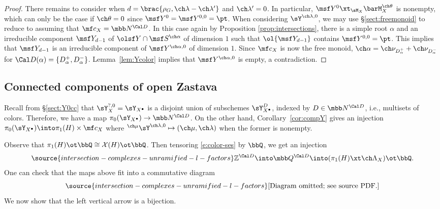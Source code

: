 \begin{proof}
There remains to consider when $d= \brac{\rho_G,\ch\lambda-\ch\lambda'}$ and $\ch\lambda'=0$.
In particular, $\msf Y^0 \xt_{\sM_X} \barM^{\ch\theta}_X$ is nonempty, which can only
be the case if $\ch\theta = 0$ since $\msf Y^0 = \msf Y^{0,0}=\pt$.
When considering $\sY^{\ch\lambda,0}$, we may
use \S\ref{sect:freemonoid} to reduce to assuming that $\mf c_X = \mbb N^{\Cal D}$.
In this case again by Proposition \ref{prop:intersections}, there is a simple root $\alpha$
and an irreducible component $\msf Y_{d-1}$ of $\olsf Y \cap \msf S^{\ch\alpha}$
of dimension $1$ such that $\ol{\msf Y_{d-1}}$ contains $\msf Y^{0,0} = \pt$.
This implies that $\msf Y_{d-1}$ is an irreducible component of
$\msf Y^{\ch\alpha,0}$ of dimension $1$.
Since $\mf c_X$ is now the free monoid, $\ch\alpha = \ch\nu_{D_\alpha^+} + \ch\nu_{D_\alpha^-}$
for $\Cal D(\alpha) = \{ D_\alpha^+, D_\alpha^- \}$.
Lemma~\ref{lem:Ycolor} implies that $\msf Y^{\ch\alpha,0}$ is empty, a contradiction.
\end{proof}



\subsection{Connected components of open Zastava} \label{sect:connected-open}
Recall from \S\ref{sect:Y0cc} that $\sY_X^{?,0}=\sY_{X^\bullet}$ is a disjoint union of subschemes
$\sY_{X^\bullet}^{D}$, indexed by $D \in \mbb N^{\Cal D}$, i.e., multisets of colors.
Therefore, we have a map $\pi_0(\sY_{X^\bullet}) \to \mbb N^{\Cal D}$.
On the other hand, Corollary~\ref{cor:compY} gives an injection
$\pi_0(\sY_{X^\bullet}) \into \pi_1(H) \times \mf c_X$
where $^{\ch\mu}\sY^{\ch\lambda,0} \mapsto (\ch\mu,\ch\lambda)$ when the former
is nonempty.

Observe that $\pi_1(H) \ot \bbQ \cong \mathcal X(H) \ot \bbQ$.
Then tensoring \eqref{e:color-ses} by $\bbQ$, we get an injection
\begin{equation} \label{e:color-inj-piH}
\source{intersection-complexes-unramified-l-factors}
    \mathbb Z^{\Cal D} \into \mbb Q^{\Cal D} \into (\pi_1(H) \xt \ch\Lambda_X) \ot \bbQ.
\end{equation}
One can check that the maps above fit into a commutative diagram
\begin{equation} \label{e:Y0toBunH}
\source{intersection-complexes-unramified-l-factors}
\text{[Diagram omitted; see source PDF.]}
\end{equation}
We now show that the left vertical arrow is a bijection.





